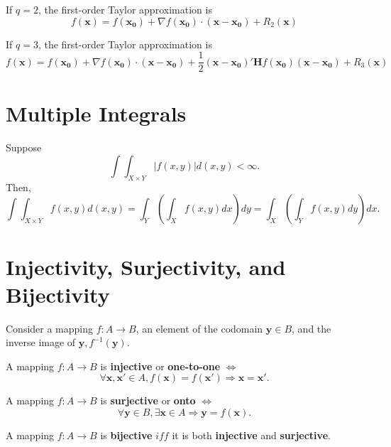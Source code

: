 \begin{corollary}
    If $q = 2$, the first-order Taylor approximation is \[
        f(\mathbf{x}) = f(\mathbf{x_0}) + \nabla f(\mathbf{x_0}) \cdot (\mathbf{x - x_0}) + R_2(\mathbf{x})
    \]
\end{corollary}

\begin{corollary}
    If $q = 3$, the first-order Taylor approximation is \[
        f(\mathbf{x}) = f(\mathbf{x_0}) + \nabla f(\mathbf{x_0}) \cdot (\mathbf{x - x_0}) + \frac{1}{2}(\mathbf{x - x_0})'\mathbf{H}f(\mathbf{x_0})(\mathbf{x-x_0}) + R_3(\mathbf{x})
    \]
\end{corollary}


\section{Multiple Integrals}

\begin{theorem}
    Suppose \[
        \int\int_{X \times Y} |f(x,y)|d(x,y) < \infty.
    \]
    Then,
    \[
        \int\int_{X \times Y} f(x,y)d(x,y) = \int_{Y}\left(\int_{X}f(x,y)dx\right)dy = \int_{X}\left(\int_{Y}f(x,y)dy\right)dx.
    \]
\end{theorem}

\section{Injectivity, Surjectivity, and Bijectivity}

Consider a mapping $f: A \to B$, an element of the codomain $\mathbf{y} \in B$, and the inverse image of $\mathbf{y}, f ^{-1}(\mathbf{y})$.

\begin{definition}
    A mapping $f: A \to B$ is \textbf{injective} or \textbf{one-to-one} $\iff$ \[
        \forall \mathbf{x},\mathbf{x'} \in A, f(\mathbf{x}) = f(\mathbf{x'}) \Longrightarrow \mathbf{x} = \mathbf{x'}.
    \]
\end{definition}


\begin{definition}
    A mapping $f: A \to B$ is \textbf{surjective} or \textbf{onto} $\iff$ \[
        \forall \mathbf{y} \in B, \exists \mathbf{x} \in A \Longrightarrow \mathbf{y} = f(\mathbf{x}).
    \]
\end{definition}

\begin{definition}
    A mapping $f: A \to B$ is \textbf{bijective} $iff$ it is both \textbf{injective} and \textbf{surjective}.
\end{definition}

